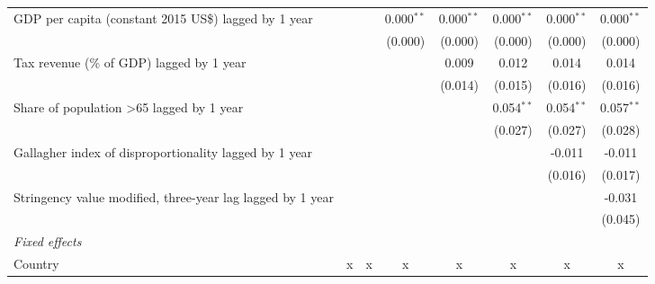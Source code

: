 \begin{tabular}{lccccccc}
   GDP per capita (constant 2015 US\$) lagged by 1 year                                           &         &         & 0.000$^{**}$ & 0.000$^{**}$ & 0.000$^{**}$ & 0.000$^{**}$ & 0.000$^{**}$\\   
                                                                                                  &         &         & (0.000)      & (0.000)      & (0.000)      & (0.000)      & (0.000)\\   
   Tax revenue (\% of GDP) lagged by 1 year                                                       &         &         &              & 0.009        & 0.012        & 0.014        & 0.014\\   
                                                                                                  &         &         &              & (0.014)      & (0.015)      & (0.016)      & (0.016)\\   
   Share of population >65 lagged by 1 year                                                       &         &         &              &              & 0.054$^{**}$ & 0.054$^{**}$ & 0.057$^{**}$\\   
                                                                                                  &         &         &              &              & (0.027)      & (0.027)      & (0.028)\\   
   Gallagher index of disproportionality lagged by 1 year                                         &         &         &              &              &              & -0.011       & -0.011\\   
                                                                                                  &         &         &              &              &              & (0.016)      & (0.017)\\   
   Stringency value modified, three-year lag lagged by 1 year                                     &         &         &              &              &              &              & -0.031\\   
                                                                                                  &         &         &              &              &              &              & (0.045)\\   
   \emph{Fixed effects}\\
   Country                                                                                        & x       & x       & x            & x            & x            & x            & x\\  

\end{tabular}
